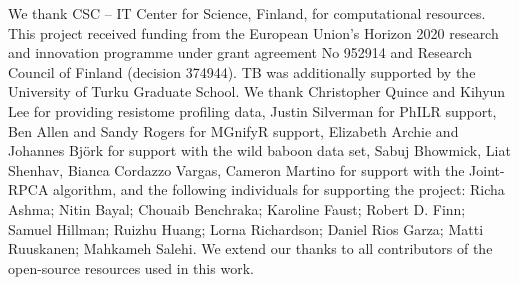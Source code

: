\documentclass[
  sn-nature,
]{sn-jnl}
\begin{document}
We thank CSC -- IT Center for Science, Finland, for computational
resources. This project received funding from the European Union's
Horizon 2020 research and innovation programme under grant agreement No
952914 and Research Council of Finland (decision 374944). TB was
additionally supported by the University of Turku Graduate School. We
thank Christopher Quince and Kihyun Lee for providing resistome
profiling data, Justin Silverman for PhILR support, Ben Allen and Sandy
Rogers for MGnifyR support, Elizabeth Archie and Johannes Björk for
support with the wild baboon data set, Sabuj Bhowmick, Liat Shenhav,
Bianca Cordazzo Vargas, Cameron Martino for support with the Joint-RPCA
algorithm, and the following individuals for supporting the project:
Richa Ashma; Nitin Bayal; Chouaib Benchraka; Karoline Faust; Robert D.
Finn; Samuel Hillman; Ruizhu Huang; Lorna Richardson; Daniel Rios Garza;
Matti Ruuskanen; Mahkameh Salehi. We extend our thanks to all
contributors of the open-source resources used in this work.
\end{document}
